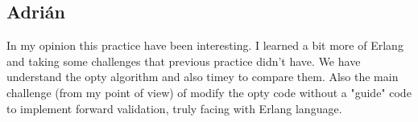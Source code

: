 \documentclass[a4paper, 10pt]{article}
\begin{document}
\subsection{Adrián}

In my opinion this practice have been interesting. I learned a bit more of Erlang and taking some challenges that previous practice didn't have. We have understand the opty algorithm and also timey to compare them. Also the main challenge (from my point of view) of modify the opty code without a "guide" code to implement forward validation, truly facing with Erlang language.
\end{document}
